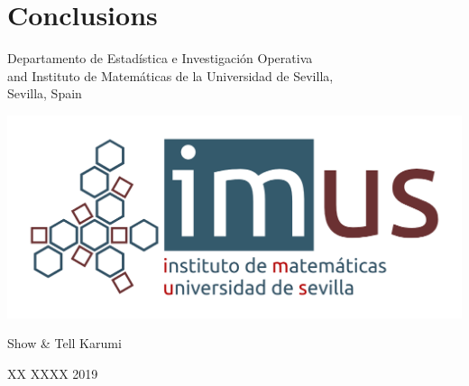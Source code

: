 \documentclass[11pt,a4paper,xcolor=dvipsnames, leqno]{beamer}
\begin{document}
\section{Conclusions}


\begingroup 
    \begin{frame}
        \titlepage
\begin{center}
\insertauthor\par
\end{center}
\begin{center}
        \scriptsize Departamento de Estad\'istica e Investigaci\'on Operativa\\ and Instituto de Matem\'aticas de la Universidad de Sevilla,\\
        Sevilla, Spain
        \end{center}
\begin{center}
\LARGE {}
\end{center}
\begin{center}
\includegraphics[scale=0.35]{imus_basico_oct.png}
\end{center}
\begin{center}
\scriptsize{Show \& Tell Karumi}
\end{center}
\begin{center}
\footnotesize{XX XXXX 2019}
\end{center}
\end{frame}
\endgroup
\end{document}
